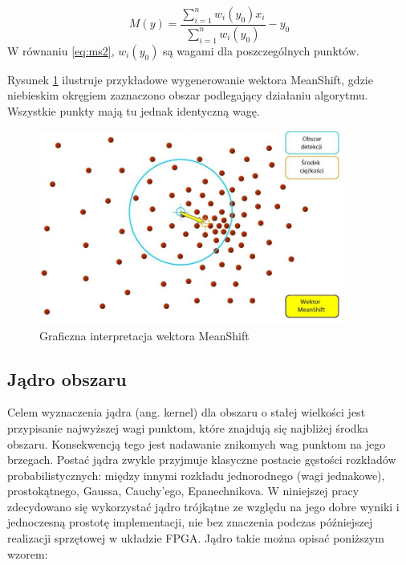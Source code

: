 \begin{equation}
\label{eq:ms2}
M(y)=\frac{\sum_{i=1}^{n}w_i(y_0)x_i}{\sum_{i=1}^{n}w_i(y_0)}-y_0
\end{equation}
W równaniu \eqref{eq:ms2}, $w_i(y_0)$ są wagami dla poszczególnych punktów.

Rysunek  \ref{fig:ms_vector} ilustruje przykładowe wygenerowanie wektora MeanShift, gdzie niebieskim okręgiem zaznaczono obszar podlegający działaniu algorytmu. 
Wszystkie punkty mają tu jednak identyczną wagę.
\begin{figure}[h]
	\centering
	\includegraphics[width=10cm]{2_meanshift.jpg}
	\caption{Graficzna interpretacja wektora MeanShift \cite{Egorov}}
	\label{fig:ms_vector}
\end{figure}


\subsection{Jądro obszaru}

Celem wyznaczenia jądra (ang. kernel) dla obszaru o stałej wielkości jest przypisanie najwyższej wagi punktom, które znajdują się najbliżej środka obszaru. 
Konsekwencją tego jest nadawanie znikomych wag punktom na jego brzegach. 
Postać jądra zwykle przyjmuje klasyczne postacie gęstości rozkładów probabilistycznych: między innymi rozkładu jednorodnego (wagi jednakowe), prostokątnego, Gaussa, Cauchy'ego, Epanechnikova. 
W niniejszej pracy zdecydowano się wykorzystać jądro trójkątne ze względu na jego dobre wyniki i jednoczesną prostotę implementacji, nie bez znaczenia podczas późniejszej realizacji sprzętowej w układzie FPGA. 
Jądro takie można opisać poniższym wzorem:

